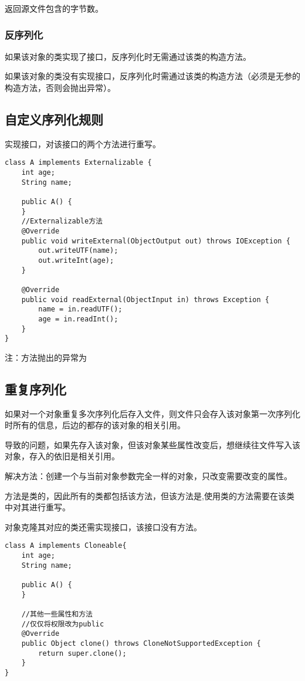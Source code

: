 \documentclass[a4paper]{report}
\begin{document}
返回源文件包含的字节数。
\subsubsection{反序列化}
如果该对象的类实现了接口，反序列化时无需通过该类的构造方法。

如果该对象的类没有实现接口，反序列化时需通过该类的构造方法（必须是无参的构造方法，否则会抛出异常）。
\subsection{自定义序列化规则}
实现接口，对该接口的两个方法进行重写。
%

\begin{Verbatim}[frame=single,numbersep=5pt,xleftmargin=1.5em,xrightmargin=1.5em]
class A implements Externalizable {
    int age;
    String name;

    public A() {
    }
    //Externalizable方法
    @Override
    public void writeExternal(ObjectOutput out) throws IOException {
        out.writeUTF(name);
        out.writeInt(age);
    }

    @Override
    public void readExternal(ObjectInput in) throws Exception {
        name = in.readUTF();
        age = in.readInt();
    }
}
\end{Verbatim}

注：方法抛出的异常为
\subsection{重复序列化}
如果对一个对象重复多次序列化后存入文件，则文件只会存入该对象第一次序列化时所有的信息，后边的都存的该对象的相关引用。

导致的问题，如果先存入该对象，但该对象某些属性改变后，想继续往文件写入该对象，存入的依旧是相关引用。

解决方法：创建一个与当前对象参数完全一样的对象，只改变需要改变的属性。

方法是类的，因此所有的类都包括该方法，但该方法是,使用类的方法需要在该类中对其进行重写。

对象克隆其对应的类还需实现接口，该接口没有方法。

\begin{lstlisting}
class A implements Cloneable{
    int age;
    String name;

    public A() {
    }

    //其他一些属性和方法
    //仅仅将权限改为public
    @Override
    public Object clone() throws CloneNotSupportedException {
        return super.clone();
    }
}
\end{lstlisting}
\end{document}
